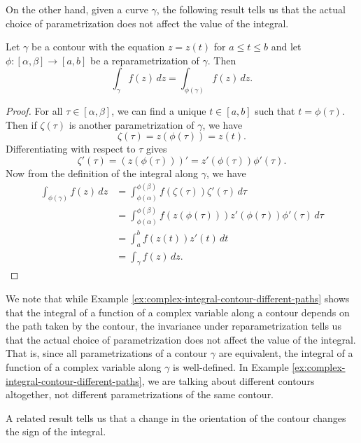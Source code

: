 On the other hand, given a curve \(\gamma\), the following result tells us that the actual choice of parametrization does not affect the value of the integral.

\begin{theorem}
    Let \(\gamma\) be a contour with the equation \(z = z(t)\) for \(a \leq t \leq b\) and let \(\phi: [\alpha, \beta] \to [a, b]\) be a reparametrization of \(\gamma\). Then
    \[
        \int_\gamma f(z) \, dz = \int_{\phi(\gamma)} f(z) \, dz.
    \]
\end{theorem}

\begin{proof}
    For all \(\tau \in [\alpha, \beta]\), we can find a unique \(t \in [a, b]\) such that \(t = \phi(\tau)\). Then if \(\zeta(\tau)\) is another parametrization of \(\gamma\), we have
    \[
        \zeta(\tau) = z(\phi(\tau)) = z(t).
    \]
    Differentiating with respect to \(\tau\) gives
    \[
        \zeta'(\tau) = \left( z(\phi(\tau)) \right)' = z'(\phi(\tau)) \phi'(\tau).
    \]
    Now from the definition of the integral along \(\gamma\), we have
    \begin{align*}
        \int_{\phi(\gamma)} f(z) \, dz &= \int_{\phi(\alpha)}^{\phi(\beta)} f(\zeta(\tau)) \zeta'(\tau) \, d\tau \\
        &= \int_{\phi(\alpha)}^{\phi(\beta)} f(z(\phi(\tau))) z'(\phi(\tau)) \phi'(\tau) \, d\tau \\
        &= \int_{a}^{b} f(z(t)) z'(t) \, dt\\
        &= \int_{\gamma} f(z) \, dz.
    \end{align*}
\end{proof}

We note that while Example \ref{ex:complex-integral-contour-different-paths} shows that the integral of a function of a complex variable along a contour depends on the path taken by the contour, the invariance under reparametrization tells us that the actual choice of parametrization does not affect the value of the integral. That is, since all parametrizations of a contour \(\gamma\) are equivalent, the integral of a function of a complex variable along \(\gamma\) is well-defined. In Example \ref{ex:complex-integral-contour-different-paths}, we are talking about different contours altogether, not different parametrizations of the same contour.

A related result tells us that a change in the orientation of the contour changes the sign of the integral.

